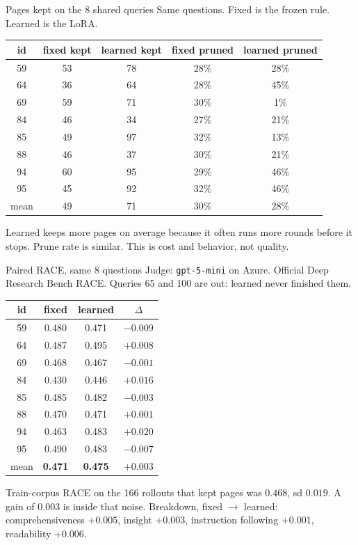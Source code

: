 \documentclass[aspectratio=169,11pt]{beamer}
\begin{document}
\begin{frame}{Pages kept on the 8 shared queries}
  Same questions. Fixed is the frozen rule. Learned is the LoRA.
  \vspace{0.2em}
  \small
  \begin{tabular}{ccccc}
    \hline
    id & fixed kept & learned kept & fixed pruned & learned pruned \\
    \hline
    59 & 53 & 78 & 28\% & 28\% \\
    64 & 36 & 64 & 28\% & 45\% \\
    69 & 59 & 71 & 30\% & 1\% \\
    84 & 46 & 34 & 27\% & 21\% \\
    85 & 49 & 97 & 32\% & 13\% \\
    88 & 46 & 37 & 30\% & 21\% \\
    94 & 60 & 95 & 29\% & 46\% \\
    95 & 45 & 92 & 32\% & 46\% \\
    \hline
    mean & 49 & 71 & 30\% & 28\% \\
    \hline
  \end{tabular}
  \vspace{0.3em}
  Learned keeps more pages on average because it often runs more rounds before it stops. Prune rate is similar. This is cost and behavior, not quality.
\end{frame}

\begin{frame}{Paired RACE, same 8 questions}
  Judge: \texttt{gpt-5-mini} on Azure. Official Deep Research Bench RACE. Queries 65 and 100 are out: learned never finished them.
  \vspace{0.25em}
  \small
  \begin{tabular}{cccc}
    \hline
    id & fixed & learned & $\Delta$ \\
    \hline
    59 & 0.480 & 0.471 & $-0.009$ \\
    64 & 0.487 & 0.495 & $+0.008$ \\
    69 & 0.468 & 0.467 & $-0.001$ \\
    84 & 0.430 & 0.446 & $+0.016$ \\
    85 & 0.485 & 0.482 & $-0.003$ \\
    88 & 0.470 & 0.471 & $+0.001$ \\
    94 & 0.463 & 0.483 & $+0.020$ \\
    95 & 0.490 & 0.483 & $-0.007$ \\
    \hline
    mean & \textbf{0.471} & \textbf{0.475} & $\mathbf{+0.003}$ \\
    \hline
  \end{tabular}
  \vspace{0.35em}
  Train-corpus RACE on the 166 rollouts that kept pages was $0.468$, sd $0.019$. A gain of $0.003$ is inside that noise.
  Breakdown, fixed $\rightarrow$ learned: comprehensiveness $+0.005$, insight $+0.003$, instruction following $+0.001$, readability $+0.006$.
\end{frame}
\end{document}
